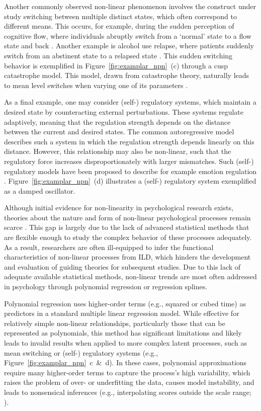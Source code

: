 \documentclass[man, floatsintext]{apa7}
\begin{document}
Another commonly observed non-linear phenomenon involves the construct under
study switching between multiple distinct states, which often
correspond to different
means. This occurs, for example, during the sudden perception of cognitive
flow, where individuals abruptly switch from a `normal' state to a flow state
and back \parencite{ceja_suddenly_2012}. Another example is alcohol use
relapse, where patients suddenly switch from an abstinent state to a relapsed
state \parencite{witkiewitz_modeling_2007}. This sudden switching behavior is
exemplified in Figure~\ref{fig:examplar_npn}~(c)
through a cusp catastrophe model. This model, drawn from catastrophe
theory, naturally leads to mean level switches when varying one of its
parameters \parencite{van_der_maas_sudden_2003,chow_cusp_2015}.

As a final example, one may consider (self-) regulatory systems, which maintain
a desired state by counteracting external perturbations. These systems regulate
adaptively, meaning that the regulation strength depends on the distance
between the
current and desired states. The common autoregressive model describes such a
system in which the regulation strength depends linearly on this distance.
However, this relationship may also be non-linear, such that the
regulatory force increases disproportionately with larger mismatches. Such
(self-) regulatory models have been proposed to describe for example emotion
regulation
\parencite{chow_emotion_2005}.
Figure~\ref{fig:examplar_npn}~(d) illustrates a
(self-) regulatory system exemplified as a damped oscillator.

Although initial evidence for non-linearity in psychological research exists,
theories about the nature and form of non-linear psychological processes remain
scarce \parencite{tan_time-varying_2011}. This gap is largely due to the lack
of advanced statistical methods that are flexible enough to study the complex
behavior of these processes adequately. As a result, researchers are often
ill-equipped to infer the functional characteristics of non-linear processes
from ILD, which hinders the development and evaluation of guiding theories for
subsequent studies. Due to this lack of adequate available statistical methods,
non-linear trends are most often addressed in psychology through polynomial
regression or regression splines.

Polynomial regression \parencite{jebb_time_2015} uses higher-order terms
(e.g., squared or cubed time) as predictors in a standard multiple linear
regression model. While effective for relatively simple non-linear
relationships,
particularly those that can be represented as polynomials, this method has
significant limitations and likely leads to invalid results when applied to
more complex latent processes, such as mean switching or (self-) regulatory
systems (e.g., Figure~\ref{fig:examplar_npn}~c~\&~d). In these cases,
polynomial approximations require many higher-order
terms to capture the process's high variability, which raises the problem of
over- or underfitting the data, causes model instability, and leads to
nonsensical inferences (e.g., interpolating scores outside the scale range;
\textcite{boyd_divergence_2009,harrell_general_2001}).
\end{document}
